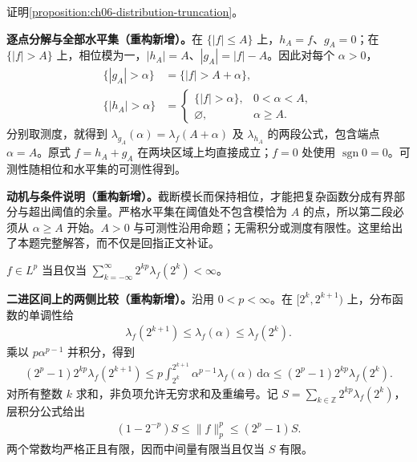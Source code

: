 \documentclass[../../main.tex]{subfiles}
\begin{document}
\begin{exercise}\label{exercise:ch06-truncation-distributions}
证明\cref{proposition:ch06-distribution-truncation}。
\end{exercise}
\begin{solution}
\textbf{逐点分解与全部水平集（重构新增）。}在 $\{|f|\leqslant A\}$ 上，$h_A=f$、$g_A=0$；在 $\{|f|>A\}$ 上，相位模为一，$|h_A|=A$、$|g_A|=|f|-A$。因此对每个 $\alpha>0$，
\begin{align*}
\{|g_A|>\alpha\}&=\{|f|>A+\alpha\},\\
\{|h_A|>\alpha\}&=\begin{cases}\{|f|>\alpha\},&0<\alpha<A,\\\varnothing,&\alpha\geqslant A.\end{cases}
\end{align*}
分别取测度，就得到 $\lambda_{g_A}(\alpha)=\lambda_f(A+\alpha)$ 及 $\lambda_{h_A}$ 的两段公式，包含端点 $\alpha=A$。原式 $f=h_A+g_A$ 在两块区域上均直接成立；$f=0$ 处使用 $\operatorname{sgn}0=0$。可测性随相位和水平集的可测性得到。
\end{solution}
\begin{remark}
\textbf{动机与条件说明（重构新增）。}截断模长而保持相位，才能把复杂函数分成有界部分与超出阈值的余量。严格水平集在阈值处不包含模恰为 $A$ 的点，所以第二段必须从 $\alpha\geqslant A$ 开始。$A>0$ 与可测性沿用命题；无需积分或测度有限性。这里给出了本题完整解答，而不仅是回指正文补证。
\end{remark}
\begin{exercise}\label{exercise:ch06-dyadic-distribution}
$f\in L^p$ 当且仅当 $\sum_{k=-\infty}^{\infty}2^{kp}\lambda_f(2^k)<\infty$。
\end{exercise}
\begin{solution}
\textbf{二进区间上的两侧比较（重构新增）。}沿用 $0<p<\infty$。在 $[2^k,2^{k+1})$ 上，分布函数的单调性给
\begin{align*}
\lambda_f(2^{k+1})\leqslant\lambda_f(\alpha)\leqslant\lambda_f(2^k).
\end{align*}
乘以 $p\alpha^{p-1}$ 并积分，得到
\begin{align*}
(2^p-1)2^{kp}\lambda_f(2^{k+1})
\leqslant p\int_{2^k}^{2^{k+1}}\alpha^{p-1}\lambda_f(\alpha)\,\mathrm d\alpha
\leqslant(2^p-1)2^{kp}\lambda_f(2^k).
\end{align*}
对所有整数 $k$ 求和，非负项允许无穷求和及重编号。记 $S=\sum_{k\in\mathbb Z}2^{kp}\lambda_f(2^k)$，层积分公式给出
\begin{align*}
(1-2^{-p})S\leqslant\|f\|_p^p\leqslant(2^p-1)S.
\end{align*}
两个常数均严格正且有限，因而中间量有限当且仅当 $S$ 有限。
\end{solution}
\end{document}
